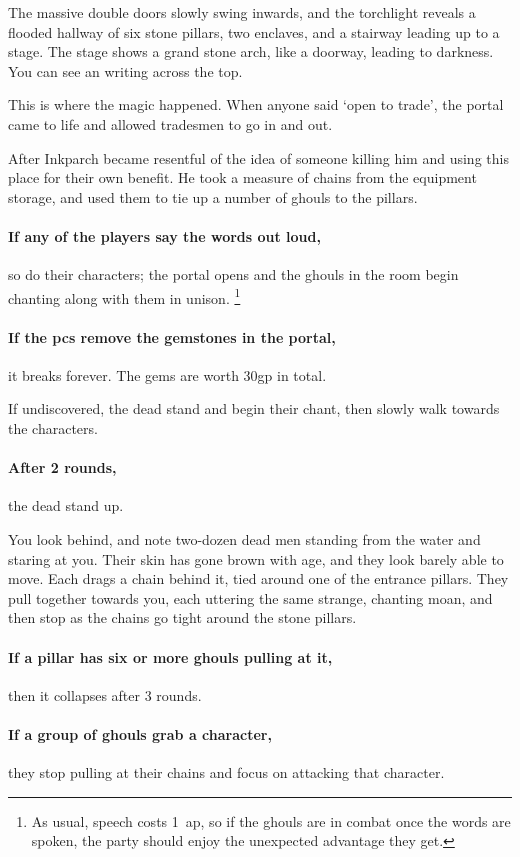 \begin{boxtext}
  The massive double doors slowly swing inwards, and the torchlight reveals a flooded hallway of six stone pillars, two enclaves, and a stairway leading up to a stage.
  The stage shows a grand stone arch, like a doorway, leading to darkness.
  You can see an writing across the top.
\end{boxtext}


\begin{exampletext}
  This is where the magic happened.
  When anyone said `open to trade', the portal came to life and allowed tradesmen to go in and out.

  After Inkparch became resentful of the idea of someone killing him and using this place for their own benefit.
  He took a measure of chains from the equipment storage, and used them to tie up a number of ghouls to the pillars.
\end{exampletext}

\paragraph{If any of the players say the words out loud,}
so do their characters; the portal opens and the ghouls in the room begin chanting along with them in unison.%
\footnote{As usual, speech costs 1~\gls{ap}, so if the ghouls are in combat once the words are spoken, the party should enjoy the unexpected advantage they get.}

\paragraph{If the \glspl{pc} remove the gemstones in the portal,}
it breaks forever.
The gems are worth 30gp in total.

If undiscovered, the dead stand and begin their chant, then slowly walk towards the characters.

\paragraph{After 2 rounds,}
the dead stand up.

\begin{boxtext}
  You look behind, and note two-dozen dead men standing from the water and staring at you.
  Their skin has gone brown with age, and they look barely able to move.
  Each drags a chain behind it, tied around one of the entrance pillars.
  They pull together towards you, each uttering the same strange, chanting moan, and then stop as the chains go tight around the stone pillars.
\end{boxtext}

\paragraph{If a pillar has six or more ghouls pulling at it,}
then it collapses after 3 rounds.

\paragraph{If a group of ghouls grab a character,}
they stop pulling at their chains and focus on attacking that character.
